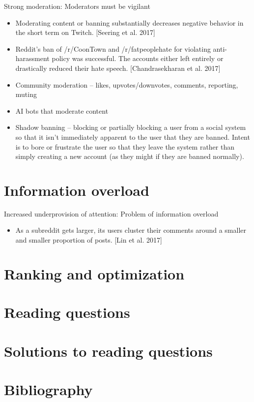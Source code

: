 \documentclass[class=book, crop=false]{standalone}
\begin{document}
Strong moderation: Moderators must be vigilant
\begin{itemize}
    \item Moderating content or banning substantially decreases negative behavior in the short term on Twitch. [Seering et al. 2017]
    \item Reddit’s ban of /r/CoonTown and /r/fatpeoplehate for violating anti-harassment policy was successful. The accounts either left entirely or drastically reduced their hate speech. [Chandrasekharan et al. 2017]
    \item Community moderation -- likes, upvotes/downvotes, comments, reporting, muting
    \item AI bots that moderate content
    \item Shadow banning -- blocking or partially blocking a user from a social system so that it isn’t immediately apparent to the user that they are banned. Intent is to bore or frustrate the user so that they leave the system rather than simply creating a new account (as they might if they are banned normally).
\end{itemize}

\section{Information overload}

Increased underprovision of attention: Problem of information overload
\begin{itemize}
    \item As a subreddit gets larger, its users cluster their comments around a smaller and smaller proportion of posts. [Lin et al. 2017]
\end{itemize}

\section{Ranking and optimization}

\section{Reading questions}

\section{Solutions to reading questions}

\section{Bibliography}
\end{document}
